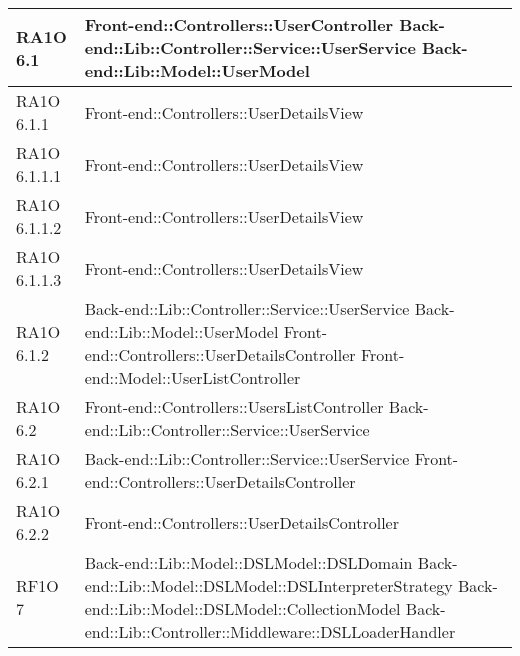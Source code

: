 \begin{center}
\begin{longtable}{ | p{3cm} | p{11cm} | }
    RA1O 6.1 & Front-end::Controllers::UserController \newline Back-end::Lib::Controller::Service::UserService \newline Back-end::Lib::Model::UserModel \\ \hline   
       
    RA1O 6.1.1 & Front-end::Controllers::UserDetailsView \newline  \\ \hline     
     
    RA1O 6.1.1.1 & Front-end::Controllers::UserDetailsView \newline  \\ \hline
        
    RA1O 6.1.1.2 & Front-end::Controllers::UserDetailsView \newline  \\ \hline
        
    RA1O 6.1.1.3 & Front-end::Controllers::UserDetailsView \newline  \\ \hline
       
    RA1O 6.1.2 & Back-end::Lib::Controller::Service::UserService \newline Back-end::Lib::Model::UserModel \newline Front-end::Controllers::UserDetailsController \newline Front-end::Model::UserListController \newline  \\ \hline     
    
    
    RA1O 6.2 & Front-end::Controllers::UsersListController \newline Back-end::Lib::Controller::Service::UserService \\ \hline     
     
    RA1O 6.2.1 & Back-end::Lib::Controller::Service::UserService \newline Front-end::Controllers::UserDetailsController \newline  \\ \hline      
    RA1O 6.2.2 & Front-end::Controllers::UserDetailsController \newline  \\ \hline      
      
    RF1O 7 & Back-end::Lib::Model::DSLModel::DSLDomain \newline Back-end::Lib::Model::DSLModel::DSLInterpreterStrategy \newline Back-end::Lib::Model::DSLModel::CollectionModel \newline Back-end::Lib::Controller::Middleware::DSLLoaderHandler \\ \hline      
    

\end{longtable}
\end{center}
